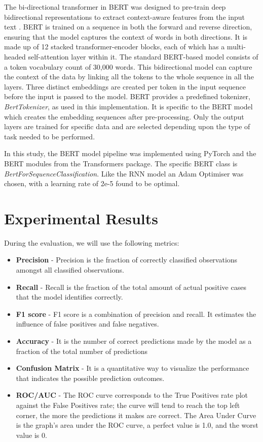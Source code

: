 \documentclass{svproc}
\begin{document}
The bi-directional transformer in BERT was designed to pre-train deep bidirectional representations to extract context-aware features from the input text \citep{devlin2018bert}. BERT is trained on a sequence in both the forward and reverse direction, ensuring that the model captures the context of words in both directions. It is made up of 12 stacked transformer-encoder blocks, each of which has a multi-headed self-attention layer within it. The standard BERT-based model consists of a token vocabulary count of 30,000 words. This bidirectional model can capture the context of the data by linking all the tokens to the whole sequence in all the layers. Three distinct embeddings are created per token in the input sequence before the input is passed to the model. BERT provides a predefined tokenizer, \textit{BertTokenizer}, as used in this implementation. It is specific to the BERT model which creates the embedding sequences after pre-processing. Only the output layers are trained for specific data and are selected depending upon the type of task needed to be performed.

In this study, the BERT model pipeline was implemented using PyTorch and the BERT modules from the Transformers package. The specific BERT class is \textit{BertForSequenceClassification}. Like the RNN model an Adam Optimiser was chosen, with a learning rate of 2e-5 found to be optimal.


\section{Experimental Results}

During the evaluation, we will use the following metrics:
\begin{itemize}
    \item \textbf{Precision} - Precision is the fraction of correctly classified observations amongst all classified observations.
    \item \textbf{Recall} - Recall is the fraction of the total amount of actual positive cases that the model identifies correctly.
    \item \textbf{F1 score} - F1 score is a combination of precision and recall. It estimates the influence of false positives and false negatives.
    \item \textbf{Accuracy} - It is the number of correct predictions made by the model as a fraction of the total number of predictions
    \item \textbf{Confusion Matrix} - It is a quantitative way to visualize the performance that indicates the possible prediction outcomes.
    \item \textbf{ROC/AUC}  - The ROC curve corresponds to the True Positives rate plot against the False Positives rate; the curve will tend to reach the top left corner, the more the predictions it makes are correct.  The Area Under Curve is the graph's area under the ROC curve, a perfect value is 1.0, and the worst value is 0.
\end{itemize}
\end{document}

